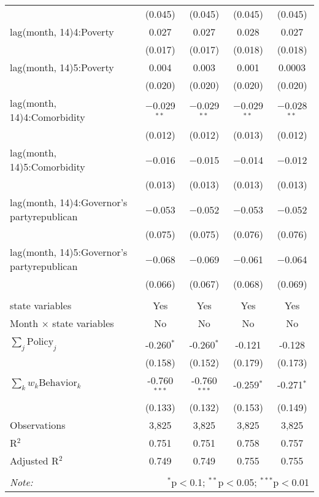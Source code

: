\begin{tabular}{@{\extracolsep{1pt}}lcccc}
  & (0.045) & (0.045) & (0.045) & (0.045) \\ 
  lag(month, 14)4:Poverty & 0.027 & 0.027 & 0.028 & 0.027 \\ 
  & (0.017) & (0.017) & (0.018) & (0.018) \\ 
  lag(month, 14)5:Poverty & 0.004 & 0.003 & 0.001 & 0.0003 \\ 
  & (0.020) & (0.020) & (0.020) & (0.020) \\ 
  lag(month, 14)4:Comorbidity & $-$0.029$^{**}$ & $-$0.029$^{**}$ & $-$0.029$^{**}$ & $-$0.028$^{**}$ \\ 
  & (0.012) & (0.012) & (0.013) & (0.012) \\ 
  lag(month, 14)5:Comorbidity & $-$0.016 & $-$0.015 & $-$0.014 & $-$0.012 \\ 
  & (0.013) & (0.013) & (0.013) & (0.013) \\ 
  lag(month, 14)4:Governor's partyrepublican & $-$0.053 & $-$0.052 & $-$0.053 & $-$0.052 \\ 
  & (0.075) & (0.075) & (0.076) & (0.076) \\ 
  lag(month, 14)5:Governor's partyrepublican & $-$0.068 & $-$0.069 & $-$0.061 & $-$0.064 \\ 
  & (0.066) & (0.067) & (0.068) & (0.069) \\ 
 \hline \\[-1.8ex] 
state variables & Yes & Yes & Yes & Yes \\ 
Month $\times$ state variables & No & No & No & No \\ 
\hline \\[-1.8ex] 
$\sum_j \mathrm{Policy}_j$ & -0.260$^{*}$ & -0.260$^{*}$ & -0.121 & -0.128 \\ 
 & (0.158) & (0.152) & (0.179) & (0.173) \\ 
$\sum_k w_k \mathrm{Behavior}_k$ & -0.760$^{***}$ & -0.760$^{***}$ & -0.259$^{*}$ & -0.271$^{*}$ \\ 
 & (0.133) & (0.132) & (0.153) & (0.149) \\ 
Observations & 3,825 & 3,825 & 3,825 & 3,825 \\ 
R$^{2}$ & 0.751 & 0.751 & 0.758 & 0.757 \\ 
Adjusted R$^{2}$ & 0.749 & 0.749 & 0.755 & 0.755 \\ 
\hline 
\hline \\[-1.8ex] 
\textit{Note:}  & \multicolumn{4}{r}{$^{*}$p$<$0.1; $^{**}$p$<$0.05; $^{***}$p$<$0.01} \\ 
\end{tabular} 